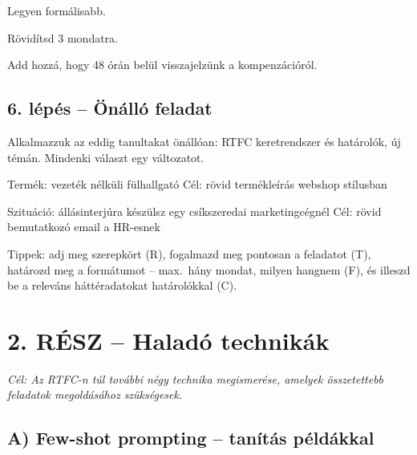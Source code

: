 \documentclass[11pt,a4paper]{article}
\begin{document}
\begin{prompt}[Finomítás]
Legyen formálisabb.
\end{prompt}
\begin{prompt}[Finomítás]
Rövidítsd 3 mondatra.
\end{prompt}
\begin{prompt}[Finomítás]
Add hozzá, hogy 48 órán belül visszajelzünk a kompenzációról.
\end{prompt}



\subsection{6. lépés -- Önálló feladat}

\noindent Alkalmazzuk az eddig tanultakat önállóan: RTFC keretrendszer és határolók, új témán. Mindenki választ egy változatot.

\begin{prompt}
Termék: vezeték nélküli fülhallgató
Cél: rövid termékleírás webshop stílusban
\end{prompt}

\begin{prompt}
Szituáció: állásinterjúra készülsz egy csíkszeredai marketingcégnél
Cél: rövid bemutatkozó email a HR-esnek
\end{prompt}

\noindent Tippek: adj meg szerepkört (R), fogalmazd meg pontosan a feladatot (T), határozd meg a formátumot -- max.\ hány mondat, milyen hangnem (F), és illeszd be a releváns háttéradatokat határolókkal (C).

\section{2. RÉSZ -- Haladó technikák}

\noindent\textit{Cél: Az RTFC-n túl további négy technika megismerése, amelyek összetettebb feladatok megoldásához szükségesek.}

\bigskip

\subsection{A) Few-shot prompting -- tanítás példákkal}
\end{document}
